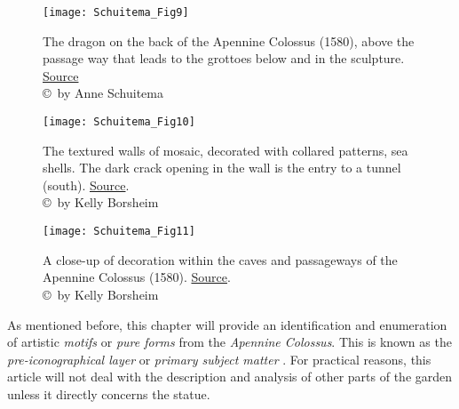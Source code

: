\begin{figure}[]
	\texttt{[image: Schuitema\_Fig9]}
	\centering
	\caption{The dragon on the back of the Apennine Colossus (1580), above the passage way that leads to the grottoes below and in the sculpture. \href{http://www.grandvoyageitaly.com/piazza/strange-places-in-italy-the-appennine-colossus-a-giant-renaissance-statue-near-florence}{Source}
		{\normalfont\scriptsize \\ \copyright\ by Anne Schuitema
	}}
	\label{fig:Fig9}

\end{figure}

\begin{figure}[]
	\texttt{[image: Schuitema\_Fig10]}
	\centering
	\caption{The textured walls of mosaic, decorated with collared patterns, sea shells. The dark crack opening in the wall is the entry to a tunnel (south). \href{http://artbyborsheim.blogspot.nl/2010_09_05_archive.html}{Source}.
		{\normalfont\scriptsize \\ \copyright\ by Kelly Borsheim
	}}
	\label{fig:Fig10}

\end{figure}

\begin{figure}[]
	\texttt{[image: Schuitema\_Fig11]}
	\centering
	\caption{A close-up of decoration within the caves and passageways of the Apennine Colossus (1580). \href{http://artbyborsheim.blogspot.nl/2010_09_05_archive.html}{Source}.
		{\normalfont\scriptsize \\ \copyright\ by Kelly Borsheim
	}}
	\label{fig:Fig11}

\end{figure}



As mentioned before, this chapter will provide an identification and enumeration of artistic \textit{motifs} or \textit{pure forms} from the \textit{Apennine Colossus}. This is known as the \textit{pre-iconographical layer} or \textit{primary subject matter} \parencites[28-30]{Panofsky1955}. For practical reasons, this article will not deal with the description and analysis of other parts of the garden unless it directly concerns the statue.


